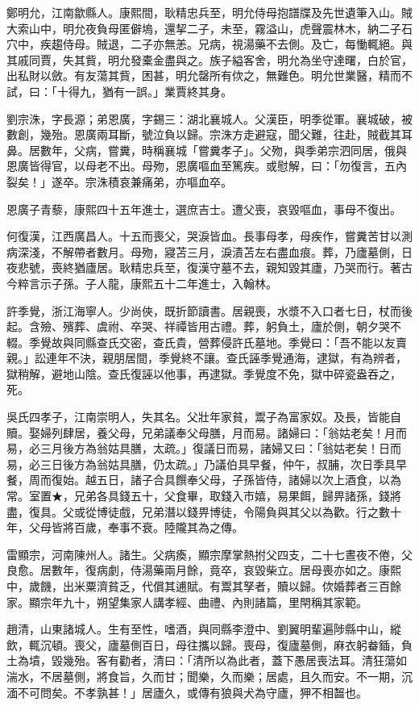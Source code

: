 \begin{pinyinscope}
鄭明允，江南歙縣人。康熙間，耿精忠兵至，明允侍母抱譜牒及先世遺筆入山。賊大索山中，明允夜負母匿僻塢，還挈二子，未至，霧溢山，虎聲震林木，納二子石穴中，疾趨侍母。賊退，二子亦無恙。兄病，視湯藥不去側。及亡，每慟輒絕。與其戚同賈，失其貲，明允發橐金盡與之。族子縊客舍，明允為坐守達曙，白於官，出私財以斂。有友蕩其貲，困甚，明允罄所有佽之，無難色。明允世業醫，精而不試，曰：「十得九，猶有一誤。」業賈終其身。

劉宗洙，字長源；弟恩廣，字錫三：湖北襄城人。父漢臣，明季從軍。襄城破，被數創，幾殆。恩廣兩耳斷，號泣負以歸。宗洙方走避寇，聞父難，往赴，賊截其耳鼻。居數年，父病，嘗糞，時稱襄城「嘗糞孝子」。父歾，與季弟宗泗同居，俄與恩廣皆得官，以母老不出。母歾，恩廣嘔血至篤疾。或慰解，曰：「勿復言，五內裂矣！」遂卒。宗洙積哀兼痛弟，亦嘔血卒。

恩廣子青藜，康熙四十五年進士，選庶吉士。遭父喪，哀毀嘔血，事母不復出。

何復漢，江西廣昌人。十五而喪父，哭淚皆血。長事母孝，母疾作，嘗糞苦甘以測病深淺，不解帶者數月。母歾，寢苫三月，淚漬苫左右盡血痕。葬，乃廬墓側，日夜悲號，喪終猶廬居。耿精忠兵至，復漢守墓不去，親知毀其廬，乃哭而行。著古今粹言示子孫。子人龍，康熙五十二年進士，入翰林。

許季覺，浙江海寧人。少尚俠，既折節讀書。居親喪，水漿不入口者七日，杖而後起。含殮、殯葬、虞祔、卒哭、祥禫皆用古禮。葬，躬負土，廬於側，朝夕哭不輟。季覺故與同縣查氏交密，查氏貴，營葬侵許氏墓地。季覺曰：「吾不能以友賣親。」訟連年不決，親朋居間，季覺終不讓。查氏誣季覺通海，逮獄，有為辨者，獄稍解，避地山陰。查氏復誣以他事，再逮獄。季覺度不免，獄中碎瓷盎吞之，死。

吳氏四孝子，江南崇明人，失其名。父壯年家貧，鬻子為富家奴。及長，皆能自贖。娶婦列肆居，養父母，兄弟議奉父母膳，月而易。諸婦曰：「翁姑老矣！月而易，必三月後方為翁姑具膳，太疏。」復議日而易，諸婦又曰：「翁姑老矣！日而易，必三日後方為翁姑具膳，仍太疏。」乃議伯具早餐，仲午，叔脯，次日季具早餐，周而復始。越五日，諸子合具饌奉父母，子孫皆侍，諸婦以次上酒食，以為常。室置★，兄弟各具錢五十，父食畢，取錢入市嬉，易果餌，歸畀諸孫，錢將盡，復具。父或從博徒戲，兄弟潛以錢畀博徒，令陽負與其父以為歡。行之數十年，父母皆將百歲，奉事不衰。陸隴其為之傳。

雷顯宗，河南陳州人。諸生。父病瘓，顯宗摩掌熱拊父四支，二十七晝夜不倦，父良愈。居數年，復病劇，侍湯藥兩月餘，竟卒，哀毀柴立。居母喪亦如之。康熙中，歲饑，出米粟濟貧乏，代償其逋賦。有鬻其孥者，贖以歸。佽婚葬者三百餘家。顯宗年九十，朔望集家人講孝經、曲禮、內則諸篇，里閈稱其家範。

趙清，山東諸城人。生有至性，嗜酒，與同縣李澄中、劉翼明輩遍陟縣中山，縱飲，輒沉頓。喪父，廬墓側百日，母往攜以歸。喪母，復廬墓側，麻衣躬畚鍤，負土為墳，毀幾殆。客有勸者，清曰：「清所以為此者，蓋下愚居喪法耳。清狂蕩如湍水，不居墓側，將食旨，久而甘；聞樂，久而樂；居處，且久而安。不一期，沉湎不可問矣。不孝孰甚！」居廬久，或傳有狼與犬為守廬，狎不相齧也。


\end{pinyinscope}
